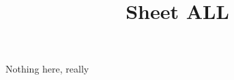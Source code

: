 \documentclass[a4paper]{article}
\title{Sheet ALL}
\begin{document}
\maketitle

Nothing here, really
\end{document}
